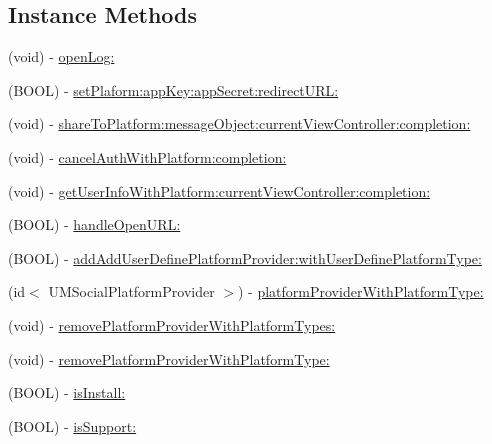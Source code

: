 \subsection*{Instance Methods}
\begin{DoxyCompactItemize}
\item 
(void) -\/ \mbox{\hyperlink{interface_u_m_social_manager_aebc3a46ef67f494b872a130057871204}{open\+Log\+:}}
\item 
(B\+O\+OL) -\/ \mbox{\hyperlink{interface_u_m_social_manager_a8214a4f6d823590b7f632f5a615732ed}{set\+Plaform\+:app\+Key\+:app\+Secret\+:redirect\+U\+R\+L\+:}}
\item 
(void) -\/ \mbox{\hyperlink{interface_u_m_social_manager_afebff9032093b6e9ee8a173de3e8fe65}{share\+To\+Platform\+:message\+Object\+:current\+View\+Controller\+:completion\+:}}
\item 
(void) -\/ \mbox{\hyperlink{interface_u_m_social_manager_af4981d741af306f9eff64b4bd3319f47}{cancel\+Auth\+With\+Platform\+:completion\+:}}
\item 
(void) -\/ \mbox{\hyperlink{interface_u_m_social_manager_a156a1ca268b414b55c54138319c9e3f2}{get\+User\+Info\+With\+Platform\+:current\+View\+Controller\+:completion\+:}}
\item 
(B\+O\+OL) -\/ \mbox{\hyperlink{interface_u_m_social_manager_a4f30d7074df154fe5d69ef769603024d}{handle\+Open\+U\+R\+L\+:}}
\item 
(B\+O\+OL) -\/ \mbox{\hyperlink{interface_u_m_social_manager_acad90bcfe7865de06595c6466a227218}{add\+Add\+User\+Define\+Platform\+Provider\+:with\+User\+Define\+Platform\+Type\+:}}
\item 
(id$<$ U\+M\+Social\+Platform\+Provider $>$) -\/ \mbox{\hyperlink{interface_u_m_social_manager_a2fbdd1e6b0106d333c3abd33ad4a4984}{platform\+Provider\+With\+Platform\+Type\+:}}
\item 
(void) -\/ \mbox{\hyperlink{interface_u_m_social_manager_a819b388a668c5ab8e5674d3ff2e9f338}{remove\+Platform\+Provider\+With\+Platform\+Types\+:}}
\item 
(void) -\/ \mbox{\hyperlink{interface_u_m_social_manager_a21a09933474869bd2a402c47c11e6293}{remove\+Platform\+Provider\+With\+Platform\+Type\+:}}
\item 
(B\+O\+OL) -\/ \mbox{\hyperlink{interface_u_m_social_manager_afbc82a79cc8d3e1b7b56339dc90693b9}{is\+Install\+:}}
\item 
(B\+O\+OL) -\/ \mbox{\hyperlink{interface_u_m_social_manager_a6a44376e989d35045a419deb79f535ef}{is\+Support\+:}}
\item 

\end{DoxyCompactItemize}
